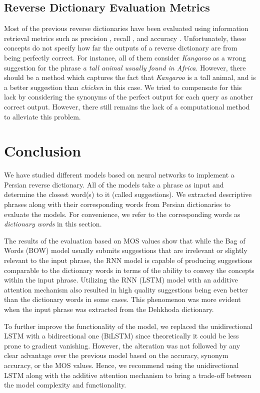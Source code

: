 \documentclass{article}
\begin{document}
\subsection{Reverse Dictionary Evaluation Metrics}
Most of the previous reverse dictionaries have been evaluated using information retrieval metrics such as precision \cite{reyes2019designing}, recall \cite{shaw2011building}, and accuracy \cite{hill2016learning}. Unfortunately, these concepts do not specify how far the outputs of a reverse dictionary are from being perfectly correct. For instance, all of them consider \textit{Kangaroo} as a wrong suggestion for the phrase \textit{a tall animal usually found in Africa}. However, there should be a method which captures the fact that \textit{Kangaroo} is a tall animal, and is a better suggestion than \textit{chicken} in this case. We tried to compensate for this lack by considering the synonyms of the perfect output for each query as another correct output. However, there still remains the lack of a computational method to alleviate this problem.
\section{Conclusion \label{sec:conclusion}}
We have studied different models based on neural networks to implement a Persian reverse dictionary. All of the models take a phrase as input and determine the closest word(s) to it (called suggestions). We extracted descriptive phrases along with their corresponding words from Persian dictionaries to evaluate the models. For convenience, we refer to the corresponding words as \textit{dictionary words} in this section.

The results of the evaluation based on MOS values show that while the Bag of Words (BOW) model usually submits suggestions that are irrelevant or slightly relevant to the input phrase, the RNN model is capable of producing suggestions comparable to the dictionary words in terms of the ability to convey the concepts within the input phrase. Utilizing the RNN (LSTM) model with an additive attention mechanism also resulted in high quality suggestions being even better than the dictionary words in some cases. This phenomenon was more evident when the input phrase was extracted from the Dehkhoda dictionary.

To further improve the functionality of the model, we replaced the unidirectional LSTM with a bidirectional one (BiLSTM) since theoretically it could be less prone to gradient vanishing. However, the alteration was not followed by any clear advantage over the previous model based on the accuracy, synonym accuracy, or the MOS values. Hence, we recommend using the unidirectional LSTM along with the additive attention mechanism to bring a trade-off between the model complexity and functionality.
\end{document}
